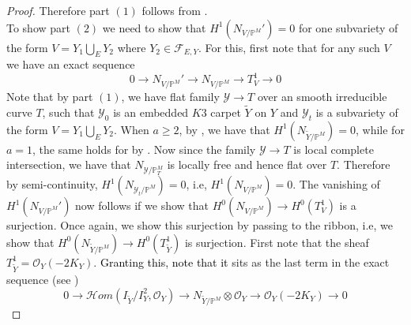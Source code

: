\documentclass[11pt,twoside]{amsart}
\theoremstyle{plain}
\numberwithin{equation}{section}
\theoremstyle{definition}
\begin{document}
\begin{proof}
Therefore part $(1)$ follows from \cite[Theorem $2.10$]{BGM24}. \\
To show part $(2)$ we need to show that $H^1(N_{V/\mathbb{P}^M}') = 0$ for one subvariety of the form $V = Y_1 \bigcup_E Y_2$ where $Y_2 \in \mathcal{F}_{E,Y}$. For this, first note that for any such $V$ we have an exact sequence 
$$0 \to N_{V/\mathbb{P}^M}' \to N_{V/\mathbb{P}^M} \to T_V^1 \to 0$$
Note that by part $(1)$, we have flat family $\mathcal{Y} \to T$ over an smooth irreducible curve $T$, such that $\mathcal{Y}_0$ is an embedded $K3$ carpet $\widetilde{Y}$ on $Y$ and $\mathcal{Y}_t$ is a subvariety of the form $V = Y_1 \bigcup_E Y_2$. When $a \geq 2$, by \cite[Theorem $5.1$, equation $(5.9)$]{BMR21}, we have that $H^1(N_{\widetilde{Y}/\mathbb{P}^M}) = 0$, while for $a = 1$, the same holds for by \cite[Theorem $4.1$]{GP97}. Now since the family $\mathcal{Y} \to T$ is local complete intersection, we have that $N_{\mathcal{Y}/\mathbb{P}_T^M}$ is locally free and hence flat over $T$. Therefore by semi-continuity, $H^1(N_{\mathcal{Y}_t/\mathbb{P}^M}) = 0$, i.e, $H^1(N_{V/\mathbb{P}^M}) = 0$. The vanishing of $H^1(N_{V/\mathbb{P}^M}')$ now follows if we show that $H^0(N_{V/\mathbb{P}^M}) \to H^0(T_V^1)$ is a surjection. Once again, we show this surjection by passing to the ribbon, i.e, we show that $H^0(N_{\widetilde{Y}/\mathbb{P}^M}) \to H^0(T_{\widetilde{Y}}^1)$ is surjection. First note that the sheaf $T_{\widetilde{Y}}^1 = \mathcal{O}_Y(-2K_Y)$. \textcolor{black}{Granting this, note that it} sits as the last term in the exact sequence (see ) 
\begin{equation*}
    0 \to \mathcal{H}om(I_{\widetilde{Y}}/I_{Y}^2, \mathcal{O}_Y) \to N_{\widetilde{Y}/\mathbb{P}^M} \otimes \mathcal{O}_Y \to \mathcal{O}_Y(-2K_Y) \to 0
\end{equation*}


\end{proof}
\end{document}
